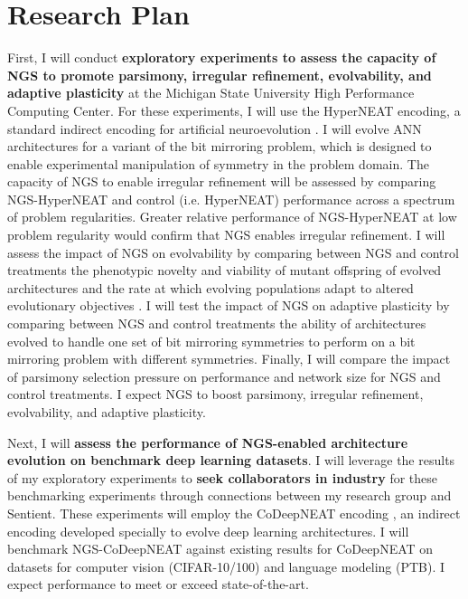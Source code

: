 \section{Research Plan}

First, I will conduct \textbf{exploratory experiments to assess the capacity of NGS to promote parsimony, irregular refinement, evolvability, and adaptive plasticity} at the Michigan State University High Performance Computing Center.
For these experiments, I will use the HyperNEAT encoding, a standard indirect encoding for artificial neuroevolution \cite{clune2011performance}.
I will evolve ANN architectures for a variant of the bit mirroring problem, which is designed to enable experimental manipulation of symmetry in the problem domain.
The capacity of NGS to enable irregular refinement will be assessed by comparing NGS-HyperNEAT and control (i.e. HyperNEAT) performance across a spectrum of problem regularities.
Greater relative performance of NGS-HyperNEAT at low problem regularity would confirm that NGS enables irregular refinement.
I will assess the impact of NGS on evolvability by comparing between NGS and control treatments the phenotypic novelty and viability of mutant offspring of evolved architectures and the rate at which evolving populations adapt to altered evolutionary objectives \cite{tarapore2015evolvability}.
I will test the impact of NGS on adaptive plasticity by comparing between NGS and control treatments the ability of architectures evolved to handle one set of bit mirroring symmetries to perform on a bit mirroring problem with different symmetries.
Finally, I will compare the impact of parsimony selection pressure on performance and network size for NGS and control treatments.
I expect NGS to boost parsimony, irregular refinement, evolvability, and adaptive plasticity.

Next, I will \textbf{assess the performance of NGS-enabled architecture evolution on benchmark deep learning datasets}.
I will leverage the results of my exploratory experiments to \textbf{seek collaborators in industry} for these benchmarking experiments through connections between my research group and Sentient.
These experiments will employ the CoDeepNEAT encoding \cite{miikkulainen2017evolving}, an indirect encoding developed specially to evolve deep learning architectures.
I will benchmark NGS-CoDeepNEAT against existing results for CoDeepNEAT on datasets for computer vision (CIFAR-10/100) and language modeling (PTB).
I expect performance to meet or exceed state-of-the-art.
